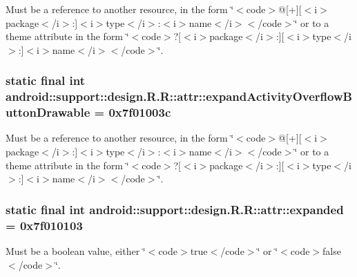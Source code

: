 Must be a reference to another resource, in the form \char`\"{}$<$code$>$@\mbox{[}+\mbox{]}\mbox{[}$<$i$>$package$<$/i$>$:\mbox{]}$<$i$>$type$<$/i$>$:$<$i$>$name$<$/i$>$$<$/code$>$\char`\"{} or to a theme attribute in the form \char`\"{}$<$code$>$?\mbox{[}$<$i$>$package$<$/i$>$:\mbox{]}\mbox{[}$<$i$>$type$<$/i$>$:\mbox{]}$<$i$>$name$<$/i$>$$<$/code$>$\char`\"{}. \hypertarget{classandroid_1_1support_1_1design_1_1_r_1_1attr_50f561e5a2864050309c5de79b98fc9c}{
\subsubsection[{expandActivityOverflowButtonDrawable}]{\setlength{\rightskip}{0pt plus 5cm}static final int android::support::design.R.R::attr::expandActivityOverflowButtonDrawable = 0x7f01003c}}
\label{classandroid_1_1support_1_1design_1_1_r_1_1attr_50f561e5a2864050309c5de79b98fc9c}


Must be a reference to another resource, in the form \char`\"{}$<$code$>$@\mbox{[}+\mbox{]}\mbox{[}$<$i$>$package$<$/i$>$:\mbox{]}$<$i$>$type$<$/i$>$:$<$i$>$name$<$/i$>$$<$/code$>$\char`\"{} or to a theme attribute in the form \char`\"{}$<$code$>$?\mbox{[}$<$i$>$package$<$/i$>$:\mbox{]}\mbox{[}$<$i$>$type$<$/i$>$:\mbox{]}$<$i$>$name$<$/i$>$$<$/code$>$\char`\"{}. \hypertarget{classandroid_1_1support_1_1design_1_1_r_1_1attr_8291442bf5e2c71593c38ed1323aa7e6}{
\subsubsection[{expanded}]{\setlength{\rightskip}{0pt plus 5cm}static final int android::support::design.R.R::attr::expanded = 0x7f010103}}
\label{classandroid_1_1support_1_1design_1_1_r_1_1attr_8291442bf5e2c71593c38ed1323aa7e6}


Must be a boolean value, either \char`\"{}$<$code$>$true$<$/code$>$\char`\"{} or \char`\"{}$<$code$>$false$<$/code$>$\char`\"{}. 

